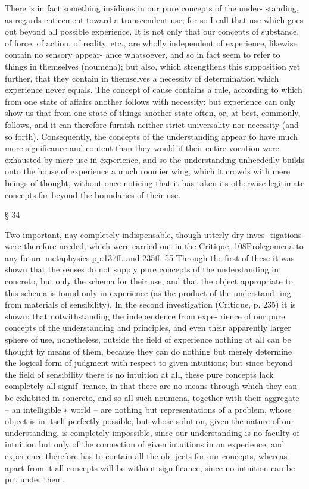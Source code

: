 There is in fact something insidious in our pure concepts of the under-
standing, as regards enticement toward a transcendent use; for so I call
that use which goes out beyond all possible experience. It is not only
that our concepts of substance, of force, of action, of reality, etc., are
wholly independent of experience, likewise contain no sensory appear-
ance whatsoever, and so in fact seem to refer to things in themselves
(noumena); but also, which strengthens this supposition yet further, that
they contain in themselves a necessity of determination which experience
never equals. The concept of cause contains a rule, according to which
from one state of affairs another follows with necessity; but experience
can only show us that from one state of things another state often, or,
at best, commonly, follows, and it can therefore furnish neither strict
universality nor necessity (and so forth).
Consequently, the concepts of the understanding appear to have much
more signiﬁcance and content than they would if their entire vocation
were exhausted by mere use in experience, and so the understanding
unheededly builds onto the house of experience a much roomier wing,
which it crowds with mere beings of thought, without once noticing that
it has taken its otherwise legitimate concepts far beyond the boundaries
of their use.

§ 34

Two important, nay completely indispensable, though utterly dry inves-
tigations were therefore needed, which were carried out in the Critique,
108Prolegomena to any future metaphysics
pp.137ff. and 235ff. 55 Through the ﬁrst of these it was shown that the
senses do not supply pure concepts of the understanding in concreto, but
only the schema for their use, and that the object appropriate to this
schema is found only in experience (as the product of the understand-
ing from materials of sensibility). In the second investigation (Critique,
p. 235) it is shown: that notwithstanding the independence from expe-
rience of our pure concepts of the understanding and principles, and
even their apparently larger sphere of use, nonetheless, outside the ﬁeld
of experience nothing at all can be thought by means of them, because
they can do nothing but merely determine the logical form of judgment
with respect to given intuitions; but since beyond the ﬁeld of sensibility
there is no intuition at all, these pure concepts lack completely all signif-
icance, in that there are no means through which they can be exhibited
in concreto, and so all such noumena, together with their aggregate – an
intelligible ∗ world – are nothing but representations of a problem, whose
object is in itself perfectly possible, but whose solution, given the nature
of our understanding, is completely impossible, since our understanding
is no faculty of intuition but only of the connection of given intuitions
in an experience; and experience therefore has to contain all the ob-
jects for our concepts, whereas apart from it all concepts will be without
signiﬁcance, since no intuition can be put under them.

